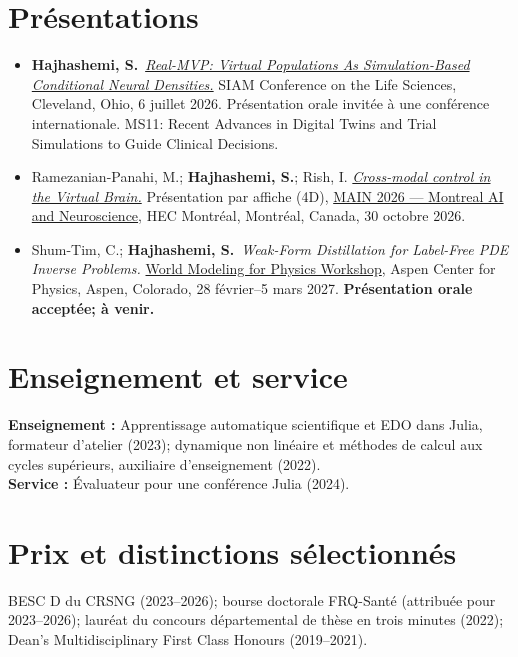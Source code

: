 \documentclass[11pt,letterpaper]{article}
\newcommand{\me}{\textbf{Hajhashemi, S.}}
\begin{document}
\section*{Présentations}
\begin{itemize}[leftmargin=1.15em,itemsep=6pt]
\item \me\ \href{https://meetings.siam.org/sess/dsp_talk.cfm?p=157552}{\textit{Real-MVP: Virtual Populations As Simulation-Based Conditional Neural Densities.}}
SIAM Conference on the Life Sciences, Cleveland, Ohio, 6 juillet 2026.
Présentation orale invitée à une conférence internationale. MS11: Recent Advances in Digital Twins and Trial Simulations to Guide Clinical Decisions.
\item Ramezanian-Panahi, M.; \me; Rish, I.
\href{https://www.main2026.org/abstracts}{\textit{Cross-modal control in the Virtual Brain.}}
Présentation par affiche (4D), \href{https://www.main2026.org/program}{MAIN 2026 — Montreal AI and Neuroscience}, HEC Montréal, Montréal, Canada, 30 octobre 2026.
\item Shum-Tim, C.; \me\ \textit{Weak-Form Distillation for Label-Free PDE Inverse Problems.}
\href{https://wmw-aspen.github.io/}{World Modeling for Physics Workshop}, Aspen Center for Physics, Aspen, Colorado, 28 février--5 mars 2027.
\textbf{Présentation orale acceptée; à venir.}
\end{itemize}

\section*{Enseignement et service}
\textbf{Enseignement :} Apprentissage automatique scientifique et EDO dans Julia, formateur d'atelier (2023); dynamique non linéaire et méthodes de calcul aux cycles supérieurs, auxiliaire d'enseignement (2022).\\
\textbf{Service :} Évaluateur pour une conférence Julia (2024).

\section*{Prix et distinctions sélectionnés}
BESC D du CRSNG (2023--2026); bourse doctorale FRQ-Santé (attribuée pour 2023--2026); lauréat du concours départemental de thèse en trois minutes (2022); Dean's Multidisciplinary First Class Honours (2019--2021).
\end{document}
